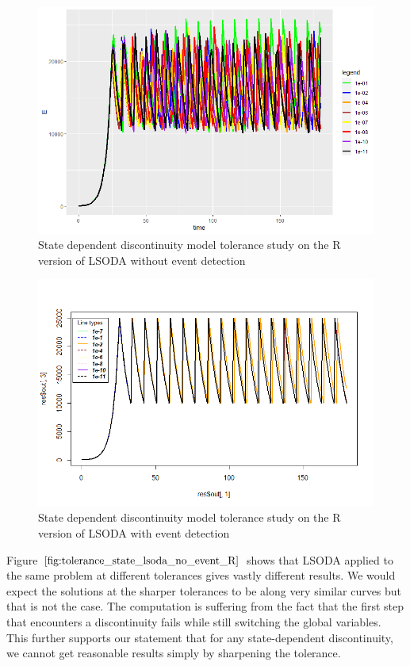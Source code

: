 \begin{figure}[h]
\centering
\includegraphics[width=0.7\linewidth]{./figures/tolerance_state_lsoda_no_event_R}
\caption{State dependent discontinuity model tolerance study on the R version of LSODA without event detection}
\label{fig:tolerance_state_lsoda_no_event_R}
\end{figure}

\begin{figure}[h]
\centering
\includegraphics[width=0.7\linewidth]{./figures/tolerance_state_lsoda_with_event_R}
\caption{State dependent discontinuity model tolerance study on the R version of LSODA with event detection}
\label{fig:tolerance_state_lsoda_with_event_R}
\end{figure}

Figure $\ref{fig:tolerance_state_lsoda_no_event_R}$ shows that LSODA applied to the same problem at different tolerances gives vastly different results. We would expect the solutions at the sharper tolerances to be along very similar curves but that is not the case. The computation is suffering from the fact that the first step that encounters a discontinuity fails while still switching the global variables. This further supports our statement that for any state-dependent discontinuity, we cannot get reasonable results simply by sharpening the tolerance.

